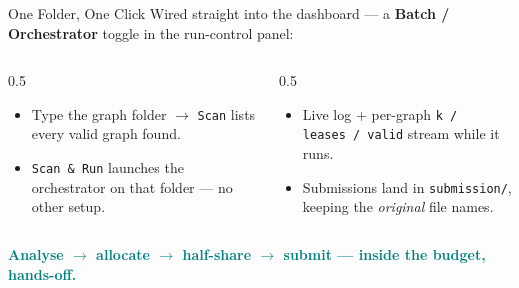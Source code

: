 \begin{frame}{One Folder, One Click}
  Wired straight into the dashboard --- a \textbf{Batch / Orchestrator} toggle in the
  run-control panel:
  \medskip
  \centering
  \medskip
  \begin{columns}[T]
    \begin{column}{0.5\textwidth}
      \begin{itemize}
        \item Type the graph folder $\to$ \texttt{Scan} lists every valid graph found.
        \item \texttt{Scan \& Run} launches the orchestrator on that folder --- no
              other setup.
      \end{itemize}
    \end{column}
    \begin{column}{0.5\textwidth}
      \begin{itemize}
        \item Live log + per-graph \texttt{k\,/\,leases\,/\,valid} stream while it runs.
        \item Submissions land in \texttt{submission/}, keeping the \emph{original}
              file names.
      \end{itemize}
    \end{column}
  \end{columns}
  \medskip
  \centering
  \small\textcolor{teal}{\textbf{Analyse $\to$ allocate $\to$ half-share $\to$ submit --- inside the budget, hands-off.}}
\end{frame}

